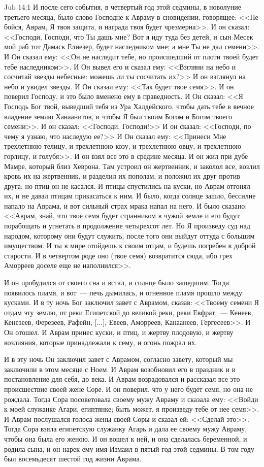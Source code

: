 \vs Jub 14:1
И после сего события, в четвертый год этой
седмины, в новолуние третьего месяца, было слово
Господне к Авраму в сновидении, говорящее: <<Не
бойся, Аврам, Я твоя защита, и награда твоя будет
чрезмерна>>. И он сказал: <<Господи, Господи,
что Ты дашь мне? Вот я иду туда без детей, и сын
Месек мой раб тот Дамаск Елиезер, будет
наследником мне; а мне Ты не дал семени>>. И Он
сказал ему: <<Он не наследит тебе, но
происшедший от плоти твоей будет тебе
наследником>>. И Он вывел его и сказал ему:
<<Взгляни на небо и сосчитай звезды небесные:
можешь ли ты сосчитать их?>> И он взглянул на
небо и увидел звезды. И Он сказал ему: <<Так
будет твое семя>>. И он поверил Господу, и это
было вменено ему в праведность. И Он сказал: <<Я
Господь Бог твой, выведший тебя из Ура Халдейского,
чтобы дать тебе в вечное владение землю
Ханаанитов, и чтобы Я был твоим Богом и Богом
твоего семени>>. И он сказал: <<Господи,
Господи!>> И он сказал: <<Господи, по чему я
узнаю, что наследую ее?>> И Он сказал ему:
<<Принеси Мне трехлетнюю телицу, и трехлетнюю
козу, и трехлетнюю овцу, и трехлетнюю горлицу, и
голубя>>. И он взял все это в средине месяца. И он
жил при дубе Мамре, который близ Хеврона. Там
устроил он жертвенник, и заколол все, возлил
кровь их на жертвенник, и разделил их пополам, и
положил их друг против друга; но птиц он не
касался. И птицы спустились на куски, но Аврам
отгонял их, и не давал птицам прикасаться к ним. И
было, когда солнце зашло, бессилие напало на
Аврама, и вот сильный страх мрака напал на него. И
было сказано: <<Аврам, знай, что твое семя будет
странником в чужой земле и его будут порабощать и
угнетать в продолжение четырехсот лет. Но Я
произведу суд над народом, которому они будут
служить; после того они выйдут оттуда с большим
имуществом. И ты в мире отойдешь к своим отцам, и
будешь погребен в доброй старости. И в четвертом
роде оно (твое семя) возвратится сюда, ибо грех
Аморреев доселе еще не наполнился>>.

И он пробудился от своего сна и встал, и солнце
было зашедшим. Тогда появилось пламя, и вот~--- печь
дымилась, и огненное пламя прошло между кусками.
И в ту ночь Бог заключил завет с Аврамом, сказав:
<<Твоему семени Я отдам эту землю, от реки
Египетской до великой реки, реки Евфрат,~--- Кенеев,
Кенезеев, Ферезеев, Рафейн, [...], Евеев, Аморреев,
Канаанеев, Гергесеев>>. И Он отошел. И Аврам
принес куски, и птиц, и жертву плодовую, и жертву
возлияния, которые принадлежали к сему, и огонь
пожрал их.

И в эту ночь Он заключил завет с Аврамом,
согласно завету, который мы заключили в этом
месяце с Ноем. И Аврам возобновил его в праздник и
в постановление для себя, до века. И Аврам
возрадовался и рассказал все это происшествие
своей жене Соре. И он поверил, что у него будет
семя, но она не рождала. Тогда Сора посоветовала
своему мужу Авраму и сказала ему: <<Войди к моей
служанке Агари, египтянке; быть может, я
произведу тебе от нее семя>>. И Аврам послушался
голоса жены своей Соры и сказал ей: <<Сделай
это>>. Тогда Сора взяла египетскую служанку
Агарь и дала ее своему мужу Авраму, чтобы она была
его женою. И он вошел к ней, и она сделалась
беременной, и родила сына, и он нарек ему имя
Измаил в пятый год этой седмины. В том году был
восемьдесят шестой год жизни Аврама.

